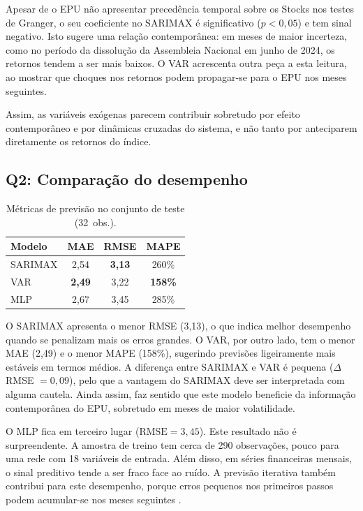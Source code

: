 \documentclass[12pt,a4paper]{article}
\begin{document}
Apesar de o EPU não apresentar precedência temporal sobre os Stocks nos testes de Granger, o seu coeficiente no SARIMAX é significativo ($p < 0{,}05$) e tem sinal negativo. Isto sugere uma relação contemporânea: em meses de maior incerteza, como no período da dissolução da Assembleia Nacional em junho de 2024, os retornos tendem a ser mais baixos. O VAR acrescenta outra peça a esta leitura, ao mostrar que choques nos retornos podem propagar-se para o EPU nos meses seguintes.

Assim, as variáveis exógenas parecem contribuir sobretudo por efeito contemporâneo e por dinâmicas cruzadas do sistema, e não tanto por anteciparem diretamente os retornos do índice.

\subsection*{Q2: Comparação do desempenho}

\begin{table}[H]
\centering\small
\caption{Métricas de previsão no conjunto de teste (32~obs.).}
\label{tab:metrics}
\begin{tabular}{lccc}
\toprule
\textbf{Modelo} & \textbf{MAE} & \textbf{RMSE} & \textbf{MAPE} \\
\midrule
SARIMAX & 2,54 & \textbf{3,13} & 260\% \\
VAR     & \textbf{2,49} & 3,22 & \textbf{158\%} \\
MLP     & 2,67 & 3,45 & 285\% \\
\bottomrule
\end{tabular}
\end{table}

O SARIMAX apresenta o menor RMSE (3,13), o que indica melhor desempenho quando se penalizam mais os erros grandes. O VAR, por outro lado, tem o menor MAE (2,49) e o menor MAPE (158\%), sugerindo previsões ligeiramente mais estáveis em termos médios. A diferença entre SARIMAX e VAR é pequena ($\Delta$RMSE $= 0{,}09$), pelo que a vantagem do SARIMAX deve ser interpretada com alguma cautela. Ainda assim, faz sentido que este modelo beneficie da informação contemporânea do EPU, sobretudo em meses de maior volatilidade.

O MLP fica em terceiro lugar ($\text{RMSE} = 3{,}45$). Este resultado não é surpreendente. A amostra de treino tem cerca de 290 observações, pouco para uma rede com 18 variáveis de entrada. Além disso, em séries financeiras mensais, o sinal preditivo tende a ser fraco face ao ruído. A previsão iterativa também contribui para este desempenho, porque erros pequenos nos primeiros passos podem acumular-se nos meses seguintes \citep{atsalakis2009surveying}.
\end{document}

